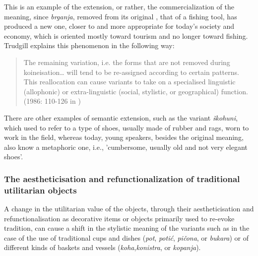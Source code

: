 \documentclass[output=paper]{LSP/langsci}
\begin{document}
This is an example of the extension, or rather, the commercialization of the meaning, since \textit{brganja}, removed from its original , that of a fishing tool, has produced a new one, closer to and more appropriate for today’s society and economy, which is oriented mostly toward tourism and no longer toward fishing. Trudgill  explains this phenomenon in the following way: 

\begin{quote}
The remaining variation, i.e. the forms that are not removed during koineisation… will tend to be re-assigned according to certain patterns. This reallocation can cause variants to take on a specialised linguistic (allophonic) or extra-linguistic (social, stylistic, or geographical) function. (1986: 110-126 in \citealt[46]{auer_study_2004})
\end{quote}

There are other examples of semantic extension, such as the variant \textit{škohuni}, which used to refer to a type of shoes, usually made of rubber and rags, worn to work in the field, whereas today, young speakers, besides the original meaning, also know a metaphoric one, i.e., 'cumbersome, usually old and not very elegant shoes'.

\subsubsection{The aestheticisation and refunctionalization of traditional utilitarian objects}

A change in the utilitarian value of the objects, through their aestheticisation and refunctionalisation as decorative items or objects primarily used to re-evoke tradition, can cause a shift in the stylistic meaning of the variants such as in the case of the use of traditional cups and dishes (\textit{pot}, \textit{potić}, \textit{pičona}, or \textit{bukara}) or of different kinds of baskets and vessels (\textit{koha},\textit{konistra}, or \textit{kopanja}). 

\begin{table}
\caption{The aestheticisation and refunctionalization of objects}
\label{tab:6}
\end{table}
\end{document}

